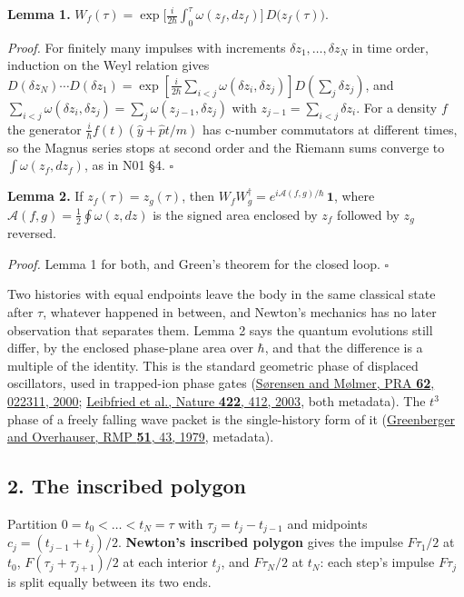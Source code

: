 \documentclass[11pt,a4paper]{article}
\begin{document}
\textbf{Lemma 1.}
\(W_f(\tau)=\exp\bigl[\frac{i}{2\hbar}\int_0^\tau\omega(z_f,dz_f)\bigr]\,D\bigl(z_f(\tau)\bigr)\).

\emph{Proof.} For finitely many impulses with increments
\(\delta z_1,\dots,\delta z_N\) in time order, induction on the Weyl
relation gives
\(D(\delta z_N)\cdots D(\delta z_1)=\exp[\frac{i}{2\hbar}\sum_{i<j}\omega(\delta z_i,\delta z_j)]D(\sum_j\delta z_j)\),
and
\(\sum_{i<j}\omega(\delta z_i,\delta z_j)=\sum_j\omega(z_{j-1},\delta z_j)\)
with \(z_{j-1}=\sum_{i<j}\delta z_i\). For a density \(f\) the generator
\(\frac{i}{\hbar}f(t)(\hat y+\hat pt/m)\) has c-number commutators at
different times, so the Magnus series stops at second order and the
Riemann sums converge to \(\int\omega(z_f,dz_f)\), as in N01 §4.
\(\square\)

\textbf{Lemma 2.} If \(z_f(\tau)=z_g(\tau)\), then
\(W_fW_g^\dagger=e^{i\mathcal A(f,g)/\hbar}\,\mathbf 1\), where
\(\mathcal A(f,g)=\frac12\oint\omega(z,dz)\) is the signed area enclosed
by \(z_f\) followed by \(z_g\) reversed.

\emph{Proof.} Lemma 1 for both, and Green's theorem for the closed loop.
\(\square\)

Two histories with equal endpoints leave the body in the same classical
state after \(\tau\), whatever happened in between, and Newton's
mechanics has no later observation that separates them. Lemma 2 says the
quantum evolutions still differ, by the enclosed phase-plane area over
\(\hbar\), and that the difference is a multiple of the identity. This
is the standard geometric phase of displaced oscillators, used in
trapped-ion phase gates
(\href{https://doi.org/10.1103/PhysRevA.62.022311}{Sørensen and Mølmer,
PRA \textbf{62}, 022311, 2000};
\href{https://doi.org/10.1038/nature01492}{Leibfried et al., Nature
\textbf{422}, 412, 2003}, both metadata). The \(t^3\) phase of a freely
falling wave packet is the single-history form of it
(\href{https://doi.org/10.1103/RevModPhys.51.43}{Greenberger and
Overhauser, RMP \textbf{51}, 43, 1979}, metadata).

\hypertarget{the-inscribed-polygon}{%
\subsection{2. The inscribed polygon}\label{the-inscribed-polygon}}

Partition \(0=t_0<\dots<t_N=\tau\) with \(\tau_j=t_j-t_{j-1}\) and
midpoints \(c_j=(t_{j-1}+t_j)/2\). \textbf{Newton's inscribed polygon}
gives the impulse \(F\tau_1/2\) at \(t_0\), \(F(\tau_j+\tau_{j+1})/2\)
at each interior \(t_j\), and \(F\tau_N/2\) at \(t_N\): each step's
impulse \(F\tau_j\) is split equally between its two ends.
\end{document}

